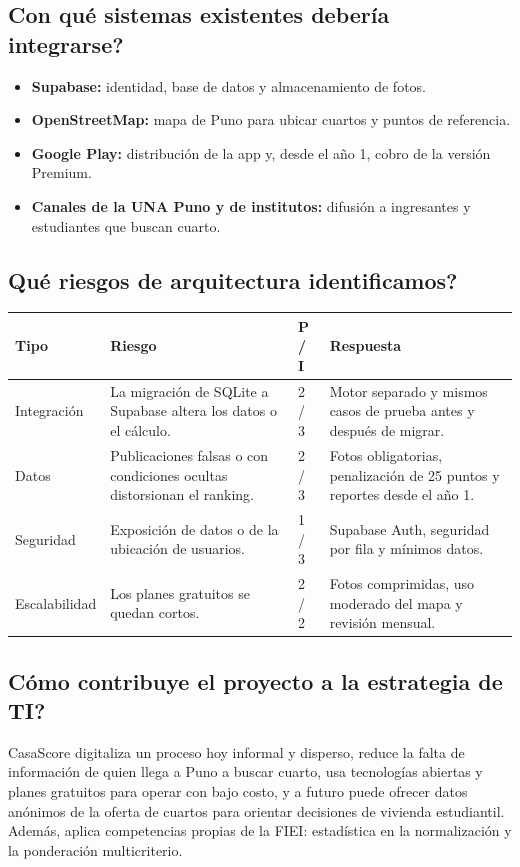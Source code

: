 \documentclass[11pt,a4paper]{article}
\begin{document}
\subsection{Con qué sistemas existentes debería integrarse?}
\begin{itemize}[leftmargin=*]
    \item \textbf{Supabase:} identidad, base de datos y almacenamiento de fotos.
    \item \textbf{OpenStreetMap:} mapa de Puno para ubicar cuartos y puntos de referencia.
    \item \textbf{Google Play:} distribución de la app y, desde el año 1, cobro de la versión Premium.
    \item \textbf{Canales de la UNA Puno y de institutos:} difusión a ingresantes y estudiantes que buscan cuarto.
\end{itemize}

\subsection{Qué riesgos de arquitectura identificamos?}
{\small
{}
\noindent\begin{tabularx}{\textwidth}{@{}P{2.3cm} L C{1.1cm} L@{}}
\toprule
{}
\textbf{Tipo} & \textbf{Riesgo} & \textbf{P / I} & \textbf{Respuesta} \\
\midrule
Integración & La migración de SQLite a Supabase altera los datos o el cálculo. & 2 / 3 & Motor separado y mismos casos de prueba antes y después de migrar. \\
Datos & Publicaciones falsas o con condiciones ocultas distorsionan el ranking. & 2 / 3 & Fotos obligatorias, penalización de 25 puntos y reportes desde el año 1. \\
Seguridad & Exposición de datos o de la ubicación de usuarios. & 1 / 3 & Supabase Auth, seguridad por fila y mínimos datos. \\
Escalabilidad & Los planes gratuitos se quedan cortos. & 2 / 2 & Fotos comprimidas, uso moderado del mapa y revisión mensual. \\
\bottomrule
\end{tabularx}
}

\subsection{Cómo contribuye el proyecto a la estrategia de TI?}
CasaScore digitaliza un proceso hoy informal y disperso, reduce la falta de información de quien llega a Puno a buscar cuarto, usa tecnologías abiertas y planes gratuitos para operar con bajo costo, y a futuro puede ofrecer datos anónimos de la oferta de cuartos para orientar decisiones de vivienda estudiantil. Además, aplica competencias propias de la FIEI: estadística en la normalización y la ponderación multicriterio.
\end{document}
